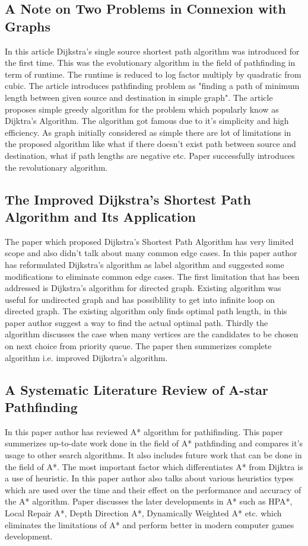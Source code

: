 \documentclass[a4paper, 12pt]{article}
\begin{document}
\subsection{A Note on Two Problems in Connexion with Graphs}
\hspace{1.2cm} 
In this article Dijkstra's single source shortest path algorithm was introduced for the first time. This was the evolutionary algorithm in the field of pathfinding in term of runtime. The runtime is reduced to log factor multiply by quadratic  from cubic. The article introduces pathfinding problem as "finding a path of minimum length between given source and destination in simple graph". The article proposes simple greedy algorithm for the problem which popularly know as Dijktra's Algorithm. The algorithm got famous due to it's simplicity and high efficiency. As graph initially considered as simple there are lot of limitations in the proposed algorithm like what if there doesn't exist path between source and destination, what if path lengths are negative etc. Paper successfully introduces the revolutionary algorithm.

\subsection{The Improved Dijkstra's Shortest Path Algorithm and Its Application}
\hspace{1.2cm} 
The paper which proposed Dijkstra's Shortest Path Algorithm has very limited scope and also didn't talk about many common edge cases. In this paper author has reformulated Dijkstra's algorithm as label algorithm and suggested some modifications to eliminate common edge cases. The first limitation that has been addressed is Dijkstra's algorithm for directed graph. Existing algorithm was useful for undirected graph and has possiblility to get into infinite loop on directed graph. The existing algorithm only finds optimal path length, in this paper author suggest a way to find the actual optimal path. Thirdly the algorithm discusses the case when many vertices are the candidates to be chosen on next choice from priority queue. The paper then summerizes complete algorithm i.e. improved Dijkstra's algorithm.

\subsection{A Systematic Literature Review of A-star Pathfinding}
\hspace{1.2cm}  
In this paper author has reviewed A* algorithm for pathifinding. This paper summerizes up-to-date work done in the field of A* pathfinding and compares it's usage to other search algorithms. It also includes future work that can be done in the field of A*. The most important factor which differentiates A* from Dijktra is a use of heuristic. In this paper author also talks about various heuristics types which are used over the time and their effect on the performance and accuracy of the A* algorithm. Paper discusses the later developments in A* such as HPA*, Local Repair A*, Depth Direction A*, Dynamically Weighted A* etc. which eliminates the limitations of A* and perform better in modern computer games development.
\end{document}
